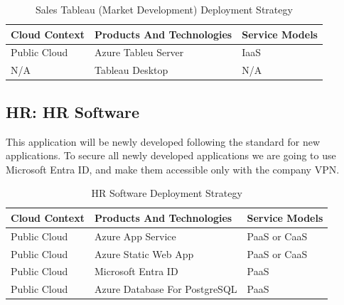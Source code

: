 \documentclass{llncs}
\begin{document}
\begin{table}[h!]
    \centering
    \begin{tabular}{lll}
        \hline
        \textbf{Cloud Context} & \textbf{Products And Technologies} & \textbf{Service Models} \\
        \hline
        Public Cloud           & Azure Tableu Server                & IaaS                    \\
        N/A                    & Tableau Desktop                    & N/A                     \\
    \end{tabular}
    \caption{Sales Tableau (Market Development) Deployment Strategy}
\end{table}

\subsection{HR: HR Software}
This application will be newly developed following the standard for new applications.
To secure all newly developed applications we are going to use Microsoft Entra ID, and make them accessible only with the company VPN.\\

\begin{table}[h!]
    \centering
    \begin{tabular}{lll}
        \hline
        \textbf{Cloud Context} & \textbf{Products And Technologies} & \textbf{Service Models} \\
        \hline
        Public Cloud           & Azure App Service                  & PaaS or CaaS            \\
        \hline
        Public Cloud           & Azure Static Web App               & PaaS or CaaS            \\

        \hline
        Public Cloud           & Microsoft Entra ID                 & PaaS                    \\
        \hline
        Public Cloud           & Azure Database For PostgreSQL      & PaaS                    \\
        \hline
    \end{tabular}
    \caption{HR Software Deployment Strategy}
\end{table}
\end{document}
